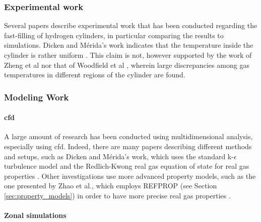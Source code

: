 \subsubsection{Experimental work}
\label{sec:experimental_work}
Several papers describe experimental work that has been conducted regarding the fast-filling of hydrogen cylinders, in particular comparing the results to simulations. Dicken and M\'erida's work indicates that the temperature inside the cylinder is rather uniform \cite{Dicken2007}. This claim is not, however supported by the work of Zheng et al \cite{Zheng2013} nor that of Woodfield et al \cite{Woodfield2008}, wherein large discrepancies among gas temperatures in different regions of the cylinder are found.



\subsubsection{Modeling Work}
\label{sec:modelingWork}

\paragraph{\gls{cfd}}


A large amount of research has been conducted using multidimensional analysis, especially using \gls{cfd}. Indeed, there are many papers describing different methods and setups, such as Dicken and M\'erida's work, which uses the standard  k-$\epsilon$ turbulence model and the Redlich-Kwong real gas equation of state for real gas properties \cite{Dicken2007a}. 
Other investigations use more advanced property models, such as the one presented by Zhao et al., which employs REFPROP (see Section \ref{sec:property_models}) in order to have more precise real gas properties \cite{Zhao2012}.

\paragraph{Zonal simulations}


